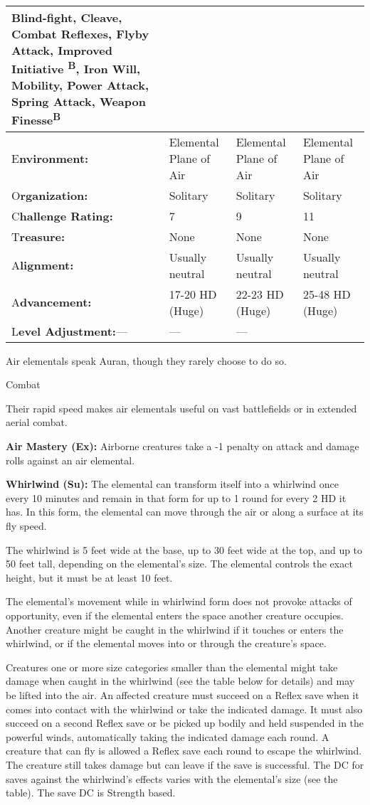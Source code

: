 \documentclass{article}
\begin{document}
\begin{tabular}{|>{\raggedright}p{49pt}|>{\raggedright}p{74pt}|>{\raggedright}p{87pt}|>{\raggedright}p{91pt}|}
Blind-fight, Cleave, Combat Reflexes, Flyby Attack, Improved Initiative \textsuperscript{B}, 
Iron Will, Mobility, Power Attack, Spring Attack, Weapon Finesse\textsuperscript{B}\tabularnewline
\hline
E\textbf{nvironment:} & Elemental Plane of Air & Elemental Plane of Air & Elemental 
Plane of Air\tabularnewline
\hline
O\textbf{rganization:} & Solitary & Solitary & Solitary\tabularnewline
\hline
C{\small{}\textbf{hallenge Rating:}} & 7 & 9 & 1{\small{}1}\tabularnewline
\hline
T\textbf{reasure:} & None & None & None\tabularnewline
\hline
A\textbf{lignment:} & Usually neutral & Usually neutral & Usually neutral\tabularnewline
\hline
A\textbf{dvancement:} & 17-20 HD (Huge) & 22-23 HD (Huge) & 25-48 HD (Huge)\tabularnewline
\hline
L\textbf{evel Adjustment:}--- & --- & --- & \tabularnewline
\hline
\end{tabular}

\vspace{12pt}
Air elementals speak Auran, though they rarely choose to do so. 

Combat

Their rapid speed makes air elementals useful on vast battlefields or in extended 
aerial combat.

\textbf{Air Mastery (Ex):} Airborne creatures take a -1 penalty on attack and damage 
rolls against an air elemental.

\textbf{Whirlwind (Su): }The elemental can transform itself into a whirlwind once 
every 10 minutes and remain in that form for up to 1 round for every 2 HD it has. 
In this form, the elemental can move through the air or along a surface at its 
fly speed.

The whirlwind is 5 feet wide at the base, up to 30 feet wide at the top, and up 
to 50 feet tall, depending on the elemental's size. The elemental controls the 
exact height, but it must be at least 10 feet.

The elemental's movement while in whirlwind form does not provoke attacks of opportunity, 
even if the elemental enters the space another creature occupies. Another creature 
might be caught in the whirlwind if it touches or enters the whirlwind, or if the 
elemental moves into or through the creature's space.

Creatures one or more size categories smaller than the elemental might take damage 
when caught in the whirlwind (see the table below for details) and may be lifted 
into the air. An affected creature must succeed on a Reflex save when it comes 
into contact with the whirlwind or take the indicated damage. It must also succeed 
on a second Reflex save or be picked up bodily and held suspended in the powerful 
winds, automatically taking the indicated damage each round. A creature that can 
fly is allowed a Reflex save each round to escape the whirlwind. The creature still 
takes damage but can leave if the save is successful. The DC for saves against 
the whirlwind's effects varies with the elemental's size (see the table). The save 
DC is Strength based.
\end{document}
